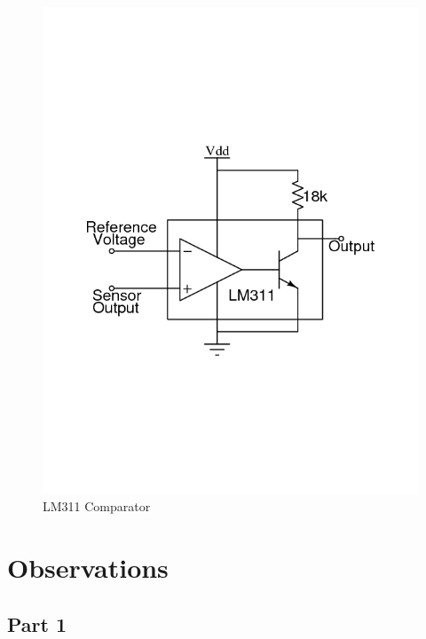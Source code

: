\documentclass[12pt]{article}
\begin{document}
\begin{figure}[H]
	\centering
	\includegraphics[width = 0.75\linewidth, trim = {0 7.5cm 0 7cm}, clip]{LM311_Comparator.png}
	\caption{LM311 Comparator}
\end{figure}

\section{Observations}

\subsection{Part 1}
\end{document}
